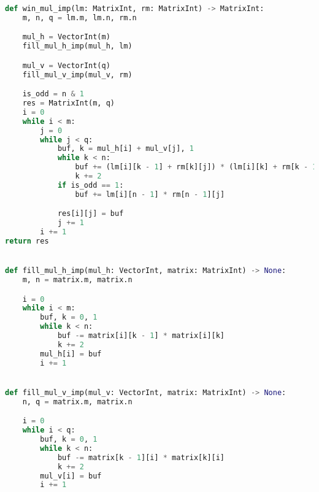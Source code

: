 
\begin{lstlisting}[style=mypython, label=lst:win-imp,caption={Функция для перемножения матриц оптимизированным алгоритмом Винограда},language=python]
def win_mul_imp(lm: MatrixInt, rm: MatrixInt) -> MatrixInt:
    m, n, q = lm.m, lm.n, rm.n

    mul_h = VectorInt(m)
    fill_mul_h_imp(mul_h, lm)

    mul_v = VectorInt(q)
    fill_mul_v_imp(mul_v, rm)

    is_odd = n & 1
    res = MatrixInt(m, q)
    i = 0
    while i < m:
        j = 0
        while j < q:
            buf, k = mul_h[i] + mul_v[j], 1
            while k < n:
                buf += (lm[i][k - 1] + rm[k][j]) * (lm[i][k] + rm[k - 1][j])
                k += 2
            if is_odd == 1:
                buf += lm[i][n - 1] * rm[n - 1][j]

            res[i][j] = buf
            j += 1
        i += 1
return res


def fill_mul_h_imp(mul_h: VectorInt, matrix: MatrixInt) -> None:
    m, n = matrix.m, matrix.n

    i = 0
    while i < m:
        buf, k = 0, 1
        while k < n:
            buf -= matrix[i][k - 1] * matrix[i][k]
            k += 2
        mul_h[i] = buf
        i += 1


def fill_mul_v_imp(mul_v: VectorInt, matrix: MatrixInt) -> None:
    n, q = matrix.m, matrix.n

    i = 0
    while i < q:
        buf, k = 0, 1
        while k < n:
            buf -= matrix[k - 1][i] * matrix[k][i]
            k += 2
        mul_v[i] = buf
        i += 1
\end{lstlisting}
